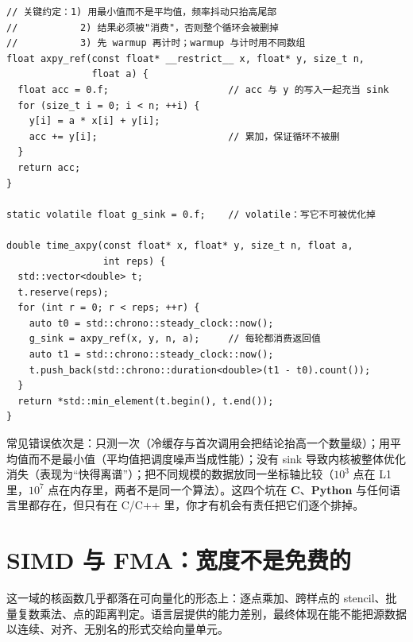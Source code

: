\documentclass[12pt,a4paper,fontset=fandol]{ctexbook}
\newcommand{\Lang}[1]{\textsf{\bfseries #1}}
\newcommand{\CL}{\Lang{C}}
\newcommand{\PY}{\Lang{Python}}
\begin{document}
\begin{lstlisting}[style=cppstyle,caption={最小可用的微基准：多次取最小值、防止死代码消除},label={lst:ch01-bench}]
// 关键约定：1) 用最小值而不是平均值，频率抖动只抬高尾部
//           2) 结果必须被"消费"，否则整个循环会被删掉
//           3) 先 warmup 再计时；warmup 与计时用不同数组
float axpy_ref(const float* __restrict__ x, float* y, size_t n,
               float a) {
  float acc = 0.f;                     // acc 与 y 的写入一起充当 sink
  for (size_t i = 0; i < n; ++i) {
    y[i] = a * x[i] + y[i];
    acc += y[i];                       // 累加，保证循环不被删
  }
  return acc;
}

static volatile float g_sink = 0.f;    // volatile：写它不可被优化掉

double time_axpy(const float* x, float* y, size_t n, float a,
                 int reps) {
  std::vector<double> t;
  t.reserve(reps);
  for (int r = 0; r < reps; ++r) {
    auto t0 = std::chrono::steady_clock::now();
    g_sink = axpy_ref(x, y, n, a);     // 每轮都消费返回值
    auto t1 = std::chrono::steady_clock::now();
    t.push_back(std::chrono::duration<double>(t1 - t0).count());
  }
  return *std::min_element(t.begin(), t.end());
}
\end{lstlisting}

\begin{warning}[title={微基准的四个坑}]
常见错误依次是：只测一次（冷缓存与首次调用会把结论抬高一个数量级）；用平均值而不是最小值（平均值把调度噪声当成性能）；没有 sink 导致内核被整体优化消失（表现为``快得离谱''）；把不同规模的数据放同一坐标轴比较（$10^3$ 点在 L1 里，$10^7$ 点在内存里，两者不是同一个算法）。这四个坑在 \CL、\PY{} 与任何语言里都存在，但只有在 C/C++ 里，你才有机会有责任把它们逐个排掉。
\end{warning}

\section{SIMD 与 FMA：宽度不是免费的}

这一域的核函数几乎都落在可向量化的形态上：逐点乘加、跨样点的 stencil、批量复数乘法、点的距离判定。语言层提供的能力差别，最终体现在能不能把源数据以连续、对齐、无别名的形式交给向量单元。
\end{document}
